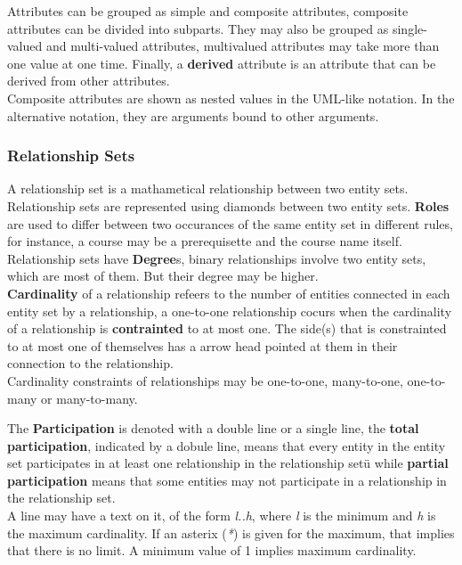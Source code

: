\documentclass[11pt,a4paper,twocolumn]{book}
\begin{document}
Attributes can be grouped as simple and composite attributes, composite attributes can be divided into subparts. They may also be grouped as single-valued and multi-valued attributes, multivalued attributes may take more than one value at one time. Finally, a \textbf{derived} attribute is an attribute that can be derived from other attributes.\\

Composite attributes are shown as nested values in the UML-like notation. In the alternative notation, they are arguments bound to other arguments.

\subsubsection{Relationship Sets}

A relationship set is a mathametical relationship between two entity sets. Relationship sets are represented using diamonds between two entity sets. \textbf{Roles} are used to differ between two occurances of the same entity set in different rules, for instance, a course may be a prerequisette and the course name itself.\\

Relationship sets have \textbf{Degree}s, binary relationships involve two entity sets, which are most of them. But their degree may be higher.\\

\textbf{Cardinality} of a relationship refeers to the  number of entities connected in each entity set by a relationship,  a one-to-one relationship cocurs when the cardinality of a relationship is \textbf{contrainted} to at most one. The side(s) that is constrainted to at most one of themselves has a arrow head pointed at them in their connection to the relationship.\\

Cardinality constraints of relationships may be one-to-one, many-to-one, one-to-many or many-to-many.

The \textbf{Participation} is denoted with a double line or a single line, the \textbf{total participation}, indicated by a dobule line, means that every entity in the entity set participates in at least one relationship in the relationship setü while \textbf{partial participation} means that some entities may not participate in a relationship in the relationship set.\\

A line may have a text on it, of the form \textit{l..h}, where \textit{l} is the minimum and \textit{h} is the maximum cardinality. If an asterix (\textit{*}) is given for the maximum, that implies that there is no limit. A minimum value of 1 implies maximum cardinality.\\
\end{document}

